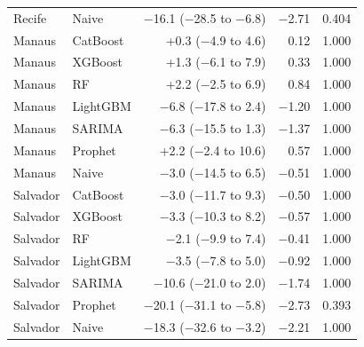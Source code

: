 \documentclass[10pt,letterpaper]{article}
\begin{document}
\begin{longtable}{llrrr}
Recife & Naive & $-$16.1 ($-$28.5 to $-$6.8) & $-$2.71 & 0.404 \\
Manaus & CatBoost & +0.3 ($-$4.9 to 4.6) & 0.12 & 1.000 \\
Manaus & XGBoost & +1.3 ($-$6.1 to 7.9) & 0.33 & 1.000 \\
Manaus & RF & +2.2 ($-$2.5 to 6.9) & 0.84 & 1.000 \\
Manaus & LightGBM & $-$6.8 ($-$17.8 to 2.4) & $-$1.20 & 1.000 \\
Manaus & SARIMA & $-$6.3 ($-$15.5 to 1.3) & $-$1.37 & 1.000 \\
Manaus & Prophet & +2.2 ($-$2.4 to 10.6) & 0.57 & 1.000 \\
Manaus & Naive & $-$3.0 ($-$14.5 to 6.5) & $-$0.51 & 1.000 \\
Salvador & CatBoost & $-$3.0 ($-$11.7 to 9.3) & $-$0.50 & 1.000 \\
Salvador & XGBoost & $-$3.3 ($-$10.3 to 8.2) & $-$0.57 & 1.000 \\
Salvador & RF & $-$2.1 ($-$9.9 to 7.4) & $-$0.41 & 1.000 \\
Salvador & LightGBM & $-$3.5 ($-$7.8 to 5.0) & $-$0.92 & 1.000 \\
Salvador & SARIMA & $-$10.6 ($-$21.0 to 2.0) & $-$1.74 & 1.000 \\
Salvador & Prophet & $-$20.1 ($-$31.1 to $-$5.8) & $-$2.73 & 0.393 \\
Salvador & Naive & $-$18.3 ($-$32.6 to $-$3.2) & $-$2.21 & 1.000 \\
\bottomrule
\end{longtable}
\end{document}
